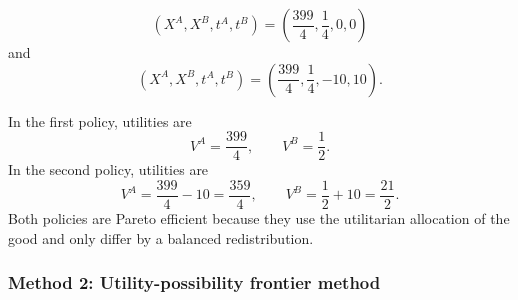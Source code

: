 \documentclass[12pt]{article}
\begin{document}
\begin{enumerate}[label=(\alph*)]
    \[
    \boxed{
    \left(X^A,X^B,t^A,t^B\right)
    =
    \left(\frac{399}{4},\frac14,0,0\right)}
    \]
    and
    \[
    \boxed{
    \left(X^A,X^B,t^A,t^B\right)
    =
    \left(\frac{399}{4},\frac14,-10,10\right).}
    \]

    In the first policy, utilities are
    \[
    V^A=\frac{399}{4},
    \qquad
    V^B=\frac12.
    \]
    In the second policy, utilities are
    \[
    V^A=\frac{399}{4}-10=\frac{359}{4},
    \qquad
    V^B=\frac12+10=\frac{21}{2}.
    \]
    Both policies are Pareto efficient because they use the utilitarian allocation of the good and only differ by a balanced redistribution.
\end{enumerate}

\newpage
\subsubsection{Method 2: Utility-possibility frontier method}
\end{document}
